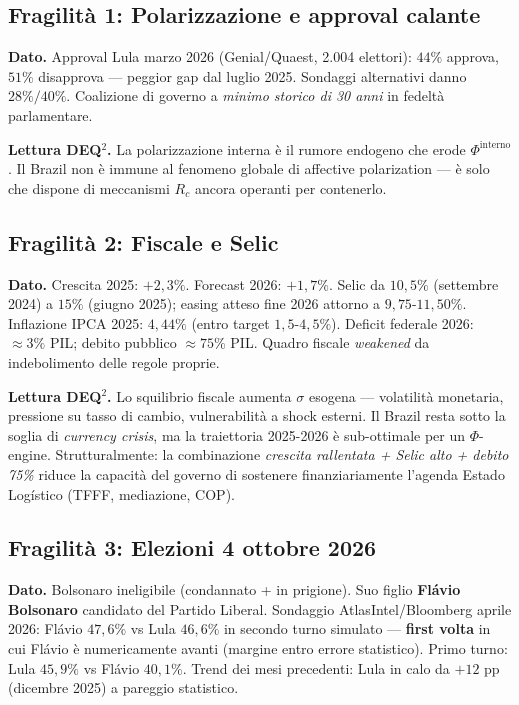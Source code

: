 \subsection{Fragilità 1: Polarizzazione e approval
calante}\label{fragilituxe0-1-polarizzazione-e-approval-calante}

\Proved{} \textbf{Dato.} Approval Lula marzo 2026 (Genial/Quaest, 2.004
elettori): \(44\%\) approva, \(51\%\) disapprova --- peggior gap dal
luglio 2025. Sondaggi alternativi danno \(28\%/40\%\). Coalizione di
governo a \emph{minimo storico di 30 anni} in fedeltà parlamentare.

\Conj{} \textbf{Lettura DEQ$^2$.} La polarizzazione interna è il rumore
endogeno che erode \(\Phi^{\text{interno}}\). Il Brazil non è immune al
fenomeno globale di affective polarization --- è solo che dispone di
meccanismi \(R_c\) ancora operanti per contenerlo.

\subsection{Fragilità 2: Fiscale e
Selic}\label{fragilituxe0-2-fiscale-e-selic}

\Proved{} \textbf{Dato.} Crescita 2025: \(+2{,}3\%\). Forecast 2026:
\(+1{,}7\%\). Selic da \(10{,}5\%\) (settembre 2024) a \(15\%\) (giugno
2025); easing atteso fine 2026 attorno a \(9{,}75\)-\(11{,}50\%\).
Inflazione IPCA 2025: \(4{,}44\%\) (entro target \(1{,}5\)-\(4{,}5\%\)).
Deficit federale 2026: \(\approx 3\%\) PIL; debito pubblico
\(\approx 75\%\) PIL. Quadro fiscale \emph{weakened} da indebolimento
delle regole proprie.

\Conj{} \textbf{Lettura DEQ$^2$.} Lo squilibrio fiscale aumenta \(\sigma\)
esogena --- volatilità monetaria, pressione su tasso di cambio,
vulnerabilità a shock esterni. Il Brazil resta sotto la soglia di
\emph{currency crisis}, ma la traiettoria 2025-2026 è sub-ottimale per
un \(\Phi\)-engine. Strutturalmente: la combinazione \emph{crescita
rallentata + Selic alto + debito 75\%} riduce la capacità del governo di
sostenere finanziariamente l'agenda Estado Logístico (TFFF, mediazione,
COP).

\subsection{Fragilità 3: Elezioni 4 ottobre
2026}\label{fragilituxe0-3-elezioni-4-ottobre-2026}

\Proved{} \textbf{Dato.} Bolsonaro ineligibile (condannato + in
prigione). Suo figlio \textbf{Flávio Bolsonaro} candidato del Partido
Liberal. Sondaggio AtlasIntel/Bloomberg aprile 2026: Flávio \(47{,}6\%\)
vs Lula \(46{,}6\%\) in secondo turno simulato --- \textbf{first volta}
in cui Flávio è numericamente avanti (margine entro errore statistico).
Primo turno: Lula \(45{,}9\%\) vs Flávio \(40{,}1\%\). Trend dei mesi
precedenti: Lula in calo da \(+12\) pp (dicembre 2025) a pareggio
statistico.

